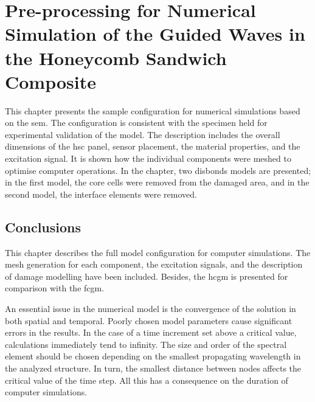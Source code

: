 
\chapter[Pre-proccessing for Numerical Simulation of the \acs{gw} in the \acs{hsc}]{Pre-processing for Numerical Simulation of the Guided Waves in the Honeycomb Sandwich Composite}
\label{ch:simulation}

This chapter presents the sample configuration for numerical simulations based on the \ac{sem}.
The configuration is consistent with the specimen held for experimental validation of the model.
The description includes the overall dimensions of the \ac{hsc} panel, sensor placement, the material properties, and the excitation signal.
It is shown how the individual components were meshed to optimise computer operations.
In the chapter, two disbonds models are presented; in the first model, the core cells were removed from the damaged area, and in the second model, the interface elements were removed.







\section{Conclusions}
\label{sec:conclusionsSimul}

This chapter describes the full model configuration for computer simulations.
The mesh generation for each component, the excitation signals, and the description of damage modelling have been included.
Besides, the \ac{hcgm} is presented for comparison with the \ac{fcgm}.

An essential issue in the numerical model is the convergence of the solution in both spatial and temporal.
Poorly chosen model parameters cause significant errors in the results.
In the case of a time increment set above a critical value, calculations immediately tend to infinity.
The size and order of the spectral element should be chosen depending on the smallest propagating wavelength in the analyzed structure.
In turn, the smallest distance between nodes affects the critical value of the time step.
All this has a consequence on the duration of computer simulations.